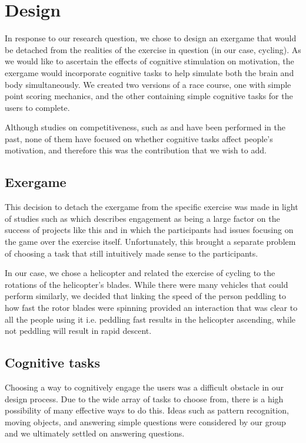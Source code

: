 \documentclass[11pt, 
]{IEEEtran}
\begin{document}
\section{Design} \label{Design}

In response to our research question, we chose to design an exergame that would be detached from the realities of the exercise in question (in our case, cycling). As we would like to ascertain the effects of cognitive stimulation on motivation, the exergame would incorporate cognitive tasks to help simulate both the brain and body simultaneously. We created two versions of a race course, one with simple point scoring mechanics, and the other containing simple cognitive tasks for the users to complete. 

Although studies on competitiveness, such as \cite{reeve1996elements} and \cite{song2010effects} have been performed in the past, none of them have focused on whether cognitive tasks affect people's motivation, and therefore this was the contribution that we wish to add.

\subsection{Exergame}

This decision to detach the exergame from the specific exercise was made in light of studies such as \cite{caldwell2013intersection} which describes engagement as being a large factor on the success of projects like this and \cite{mokka2003fitness} in which the participants had issues focusing on the game over the exercise itself. Unfortunately, this brought a separate problem of choosing a task that still intuitively made sense to the participants. 

In our case, we chose a helicopter and related the exercise of cycling to the rotations of the helicopter's blades. While there were many vehicles that could perform similarly, we decided that linking the speed of the person peddling to how fast the rotor blades were spinning provided an interaction that was clear to all the people using it i.e. peddling fast results in the helicopter ascending, while not peddling will result in rapid descent.

\subsection{Cognitive tasks}

Choosing a way to cognitively engage the users was a difficult obstacle in our design process. Due to the wide array of tasks to choose from, there is a high possibility of many effective ways to do this. Ideas such as pattern recognition, moving objects, and answering simple questions were considered by our group and we ultimately settled on answering questions. 
\end{document}

